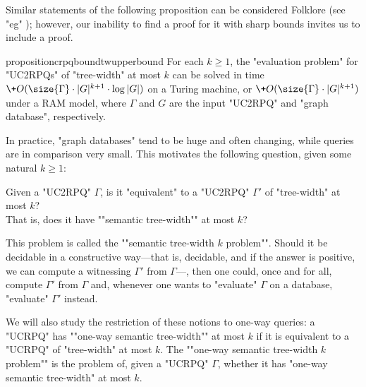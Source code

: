 Similar statements of the following proposition can be considered Folklore (see "eg" {\cite[Theorem IV.3]{RomeroBarceloVardi2017Homomorphism}}); however, our inability to find a proof for it with sharp bounds invites us to include a proof.
\begin{restatable}{proposition}{crpqboundtwupperbound}
	\AP\label{prop:crpq-bound-tree-width-upper-bound}
    For each $k \geq 1$, the "evaluation problem" for "UC2RPQs" of "tree-width" at
    most $k$ can be solved in time $\+O(\size{\Gamma} \cdot |G|^{k+1} \cdot \log{|G|})$ on a Turing machine,
	or $\+O(\size{\Gamma} \cdot |G|^{k+1})$ under a RAM model, where $\Gamma$ and $G$ are the input "UC2RPQ" and "graph database", respectively.
\end{restatable}

In practice, "graph databases" tend to be huge and often changing, while queries
are in comparison very small.
This motivates the following question, given some natural $k \geq 1$: 

\begin{center}
    \AP 
    Given a "UC2RPQ" $\Gamma$, is it "equivalent" to a "UC2RPQ" $\Gamma'$ of "tree-width" at most $k$?\\
    That is, does it have ""semantic tree-width"" at most $k$?
\end{center}
This problem is called the ""semantic tree-width $k$ problem"".
Should it be decidable in a constructive way---that is, decidable, and if the answer is positive, we can compute a witnessing $\Gamma'$ from $\Gamma$---, then one could, once and for all,
compute $\Gamma'$ from $\Gamma$ and, whenever one wants to "evaluate" $\Gamma$ on a
database, "evaluate" $\Gamma'$ instead.

We will also study the restriction of these notions to one-way queries: a "UCRPQ" has \AP""one-way semantic tree-width"" at most $k$ if it is equivalent to a "UCRPQ" of "tree-width" at most $k$. The \AP""one-way semantic tree-width $k$ problem"" is the problem of, given a "UCRPQ" $\Gamma$, whether it has "one-way semantic tree-width" at most $k$.

